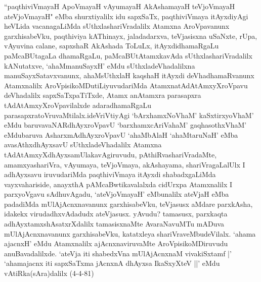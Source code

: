 \begin{artha}
``paqthiviVmayaH ApoVmayaH vAyumayaH AkAshamayaH teVjoVmayaH ateVjoVmayaH" eMba shurxtiyalilx idu sapxSaTx, paqthiviVmaya itAyxdiyAgi heVLida vacanagaLiMda sUthxlashariVra\-\break dalilx Atamxna AroVpavanunx garxhisabeVku, paqthiviya kAThinayx, jalada\break darxva, teVjasisxna uSaNxte, rUpa, vAyuvina calane, sapxshaR AkAshada ToLuLx, itAyxdidhamaRgaLu paMcaBUtagaLa dhamaRgaLu, paMca\-\break BUtAtamxkavAda sUthxlashariVradalilx kANutatxve, `ahaMmanuSayxH' eMdu sUthxladeVhadalilxna manuSayxSatavxvanunx, ahaMsUthxlaH kaqshaH itAyxdi deVhadhamaRvanunx Atamxnalilx AroVpisikoMDutiLiyuvudariMda Atamxna\break tAdAtAmxyXroVpavu deVhadalilx sapxSaTxpaTiTxde, Atamx anAtamxra parasapxra tAdAtAmxyXroVpavilalxde adaradhamaRgaLu parasapxratoVruvaMtilalx.\break ideVriVtiyAgi `bArxhamxNoVhaM' kaSxtirxyoVhaM' eMdu baruva\break vaNARdhAyxroVpavU `barxhamxcAriVahaM' gaqhasothxV\s haM' eMdu\break baruva AsharxmAdhAyxroVpavU `ahaMbAlaH `ahaMtaruNaH' eMba avasAthxdhAyxsavU sUthxladeVhadalilx Atamxna tAdAtAmxyXdhAyxsamUlaka\-vAgiruvudu, pAthiRvashariVradaMte, amamxyashariVra, vAyumaya,  teVjoVmaya, akAshayama, shariVragaLalUlx I adhAyxsavu iruvudariMda paqthiviVmaya itAyxdi shabadxgaLiMda vayxvahariside, anayxthA pAMcaBwtikavalalxda cidUrxpa Atamxnalilx I parxyoVgavu sAdhuvAgadu, `ateVjoVmayaH' eMbunalilx ateVjaH eMba padadiMda mUlA\-\break jAcnxnavanunx garxhisabeVku, teVjasusx aMdare parxkAsha, idakekx virudadhxvAdadudx ateVjasusx. yAvudu? tamasusx, parxkaqta adhAyxtamxshAsatxrXdalilx tamasisxnaMte AvaraNavuMTu mADuva mUlAjAcnxnavanunx garxhisabeVku, katatxleya shariVraveMbudeVilalx. `ahama ajacnxH' eMdu Atamxnalilx ajAcnxnaviruvaMte AroVpisikoMDiruvudu anuBavadalilxde. `ateVja iti shabedxVna mUlAjAcnxnaM vivakiSxtamf |' `ahamajacnx iti sapxSaTxma jAcnxnA dhAyxsa IkaSxyXteV ||' eMdu vAtiRka(sAra)dalilx (4-4-81)
\end{artha}


